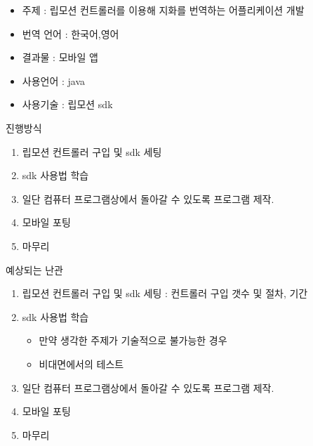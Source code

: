 \documentclass[10pt]{beamer}
\begin{document}
\begin{frame}{}
  \begin{itemize}
    \item 주제 : 립모션 컨트롤러를 이용해 지화를 번역하는 어플리케이션 개발
    \item 번역 언어 : 한국어,영어
    \item 결과물 : 모바일 앱
    \item 사용언어 : java
    \item 사용기술 : 립모션 sdk
  \end{itemize}
\end{frame}

\begin{frame}{진행방식}
  \begin{enumerate}
    \item 립모션 컨트롤러 구입 및 sdk 세팅
    \item sdk 사용법 학습
    \item 일단 컴퓨터 프로그램상에서 돌아갈 수 있도록 프로그램 제작.
    \item 모바일 포팅
    \item 마무리
  \end{enumerate}
\end{frame}

\begin{frame}{예상되는 난관}
  \begin{enumerate}
    \item 립모션 컨트롤러 구입 및 sdk 세팅 : 컨트롤러 구입 갯수 및 절차, 기간
    \item sdk 사용법 학습 
    \begin{itemize}
      \item 만약 생각한 주제가 기술적으로 불가능한 경우
      \item 비대면에서의 테스트
    \end{itemize}
    \item 일단 컴퓨터 프로그램상에서 돌아갈 수 있도록 프로그램 제작.
    \item 모바일 포팅
    \item 마무리
  \end{enumerate}
\end{frame}





\end{document}
